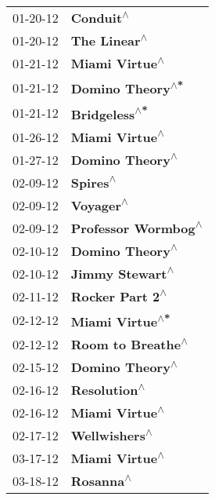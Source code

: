 \begin{supertabular}{p{0.25\columnwidth}p{0.75\columnwidth}}
 01-20-12 &                      \textbf{Conduit\textsuperscript{$\wedge$}} \\
 01-20-12 &                   \textbf{The Linear\textsuperscript{$\wedge$}} \\
 01-21-12 &                 \textbf{Miami Virtue\textsuperscript{$\wedge$}} \\
 01-21-12 &               \textbf{Domino Theory\textsuperscript{$\wedge$*}} \\
 01-21-12 &                  \textbf{Bridgeless\textsuperscript{$\wedge$*}} \\
 01-26-12 &                 \textbf{Miami Virtue\textsuperscript{$\wedge$}} \\
 01-27-12 &                \textbf{Domino Theory\textsuperscript{$\wedge$}} \\
 02-09-12 &                       \textbf{Spires\textsuperscript{$\wedge$}} \\
 02-09-12 &                      \textbf{Voyager\textsuperscript{$\wedge$}} \\
 02-09-12 &            \textbf{Professor Wormbog\textsuperscript{$\wedge$}} \\
 02-10-12 &                \textbf{Domino Theory\textsuperscript{$\wedge$}} \\
 02-10-12 &                \textbf{Jimmy Stewart\textsuperscript{$\wedge$}} \\
 02-11-12 &                \textbf{Rocker Part 2\textsuperscript{$\wedge$}} \\
 02-12-12 &                \textbf{Miami Virtue\textsuperscript{$\wedge$*}} \\
 02-12-12 &              \textbf{Room to Breathe\textsuperscript{$\wedge$}} \\
 02-15-12 &                \textbf{Domino Theory\textsuperscript{$\wedge$}} \\
 02-16-12 &                   \textbf{Resolution\textsuperscript{$\wedge$}} \\
 02-16-12 &                 \textbf{Miami Virtue\textsuperscript{$\wedge$}} \\
 02-17-12 &                  \textbf{Wellwishers\textsuperscript{$\wedge$}} \\
 03-17-12 &                 \textbf{Miami Virtue\textsuperscript{$\wedge$}} \\
 03-18-12 &                      \textbf{Rosanna\textsuperscript{$\wedge$}} \\

\end{supertabular}
